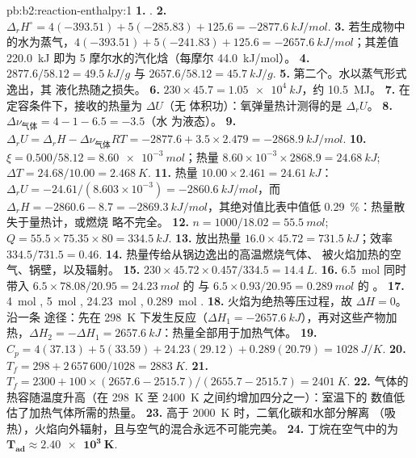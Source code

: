 \begin{solution}{pb:b2:reaction-enthalpy:1}
\textbf{1.} .
\textbf{2.} $\Delta_r H^\circ = 4(-393.51) + 5(-285.83) + 125.6 =
\qty{-2877.6}{kJ/mol}$.
\textbf{3.} 若生成物中的水为蒸气，$4(-393.51) + 5(-241.83) + 125.6 =
\qty{-2657.6}{kJ/mol}$；其差值 \qty{220.0}{kJ} 即为
5 摩尔水的汽化焓（每摩尔 \qty{44.0}{kJ/mol}）。
\textbf{4.} $2877.6/58.12 = \qty{49.5}{kJ/g}$ 与 $2657.6/58.12 =
\qty{45.7}{kJ/g}$.
\textbf{5.} 第二个。水以蒸气形式逸出，其
液化热随之损失。
\textbf{6.} $230 \times 45.7 = \qty{1.05e4}{kJ}$，约 \qty{10.5}{MJ}。
\textbf{7.} 在定容条件下，接收的热量为 $\Delta U$（无
体积功）：氧弹量热计测得的是 $\Delta_r U$。
\textbf{8.} $\Delta\nu_{\text{气体}} = 4 - 1 - 6.5 = -3.5$（水
为液态）。
\textbf{9.} $\Delta_r U = \Delta_r H - \Delta\nu_{\text{气体}}RT = -2877.6 +
3.5 \times 2.479 = \qty{-2868.9}{kJ/mol}$.
\textbf{10.} $\xi = 0.500/58.12 = \qty{8.60e-3}{mol}$；热量 $8.60 \times
10^{-3} \times 2868.9 = \qty{24.68}{kJ}$; $\Delta T = 24.68/10.00 =
\qty{2.468}{K}$.
\textbf{11.} 热量 $10.00 \times 2.461 = \qty{24.61}{kJ}$：$\Delta_r U =
-24.61/(8.603 \times 10^{-3}) = \qty{-2860.6}{kJ/mol}$，而 $\Delta_r H =
-2860.6 - 8.7 = \qty{-2869.3}{kJ/mol}$，其绝对值比表中值低
\qty{0.29}{\percent}：热量散失于量热计，或燃烧
略不完全。
\textbf{12.} $n = 1000/18.02 = \qty{55.5}{mol}$; $Q = 55.5 \times 75.35
\times 80 = \qty{334.5}{kJ}$.
\textbf{13.} 放出热量 $16.0 \times 45.72 = \qty{731.5}{kJ}$；效率
$334.5/731.5 = 0.46$.
\textbf{14.} 热量传给从锅边逸出的高温燃烧气体、
被火焰加热的空气、锅壁，以及辐射。
\textbf{15.} $230 \times 45.72 \times 0.457/334.5 = \qty{14.4}{L}$.
\textbf{16.} \qty{6.5}{mol}  同时带入 $6.5 \times 78.08/20.95 =
\qty{24.23}{mol}$ 的  与 $6.5 \times 0.93/20.95 = \qty{0.289}{mol}$
的 。
\textbf{17.} \qty{4}{mol} , \qty{5}{mol} ,
\qty{24.23}{mol} , \qty{0.289}{mol} .
\textbf{18.} 火焰为绝热等压过程，故 $\Delta H = 0$。沿一条
途径：先在 \qty{298}{K} 下发生反应（$\Delta H_1 =
\qty{-2657.6}{kJ}$），再对这些产物加热，$\Delta H_2 =
-\Delta H_1 = \qty{+2657.6}{kJ}$：热量全部用于加热气体。
\textbf{19.} $C_p = 4(37.13) + 5(33.59) + 24.23(29.12) + 0.289(20.79) =
\qty{1028}{J/K}$.
\textbf{20.} $T_f = 298 + 2\,657\,600/1028 = \qty{2883}{K}$.
\textbf{21.} $T_f = 2300 + 100 \times (2657.6 - 2515.7)/(2655.7 - 2515.7) =
\qty{2401}{K}$.
\textbf{22.} 气体的热容随温度升高（在
\qty{298}{K} 至 \qty{2400}{K} 之间约增加四分之一）：室温下的
数值低估了加热气体所需的热量。
\textbf{23.} 高于 \qty{2000}{K} 时，二氧化碳和水部分解离
（吸热），火焰向外辐射，且与空气的混合永远不可能完美。
\textbf{24.} 丁烷在空气中的为
$\boldsymbol{T_{\text{ad}} \approx \qty{2.40e3}{K}}$.
\end{solution}
